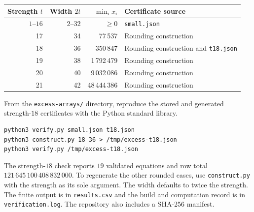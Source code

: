 \documentclass[11pt]{article}
\newcommand{\code}[1]{\texttt{#1}}
\begin{document}
\begin{center}
\begin{tabular}{rrrl}
\toprule
Strength \(t\) & Width \(2t\) & \(\min_i x_i\) & Certificate source\\
\midrule
\(1\)--\(16\) & \(2\)--\(32\) & \(\ge 0\) & \code{small.json}\\
17 & 34 & 77\,537 & Rounding construction\\
18 & 36 & 350\,847 & Rounding construction and \code{t18.json}\\
19 & 38 & 1\,792\,479 & Rounding construction\\
20 & 40 & 9\,032\,086 & Rounding construction\\
21 & 42 & 48\,444\,386 & Rounding construction\\
\bottomrule
\end{tabular}
\end{center}

From the \code{excess-arrays/} directory, reproduce the stored and generated
strength-\(18\) certificates with the Python standard library.
\begin{verbatim}
python3 verify.py small.json t18.json
python3 construct.py 18 36 > /tmp/excess-t18.json
python3 verify.py /tmp/excess-t18.json
\end{verbatim}
The strength-\(18\) check reports \(19\) validated equations and row total
\(121\,645\,100\,408\,832\,000\). To regenerate the other rounded cases,
use \code{construct.py} with the strength as its sole argument. The width
defaults to twice the strength. The finite output is in \code{results.csv}
and the build and computation record is in \code{verification.log}.
The repository also includes a SHA-256 manifest.
\end{document}
